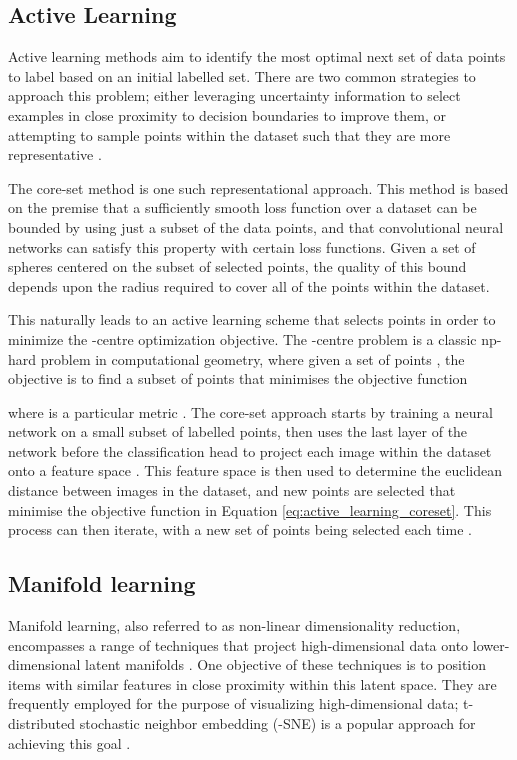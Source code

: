 \documentclass{article}
\begin{document}
\subsection{Active Learning}

Active learning methods aim to identify the most optimal next set of data points to label based on an initial labelled set. There are two common strategies to approach this problem; either leveraging uncertainty information to select examples in close proximity to decision boundaries to improve them, or attempting to sample points within the dataset such that they are more representative \citep{budd2021survey}.

The core-set method \citep{sener2017active} is one such representational approach. This method is based on the premise that a sufficiently smooth loss function over a dataset can be bounded by using just a subset of the data points, and that convolutional neural networks can satisfy this property with certain loss functions. Given a set of spheres centered on the subset of selected points, the quality of this bound depends upon the radius required to cover all of the points within the dataset.

This naturally leads to an active learning scheme that selects points in order to minimize the -centre optimization objective. The -centre problem \citep{dyer1985simple} is a classic np-hard problem in computational geometry, where given a set of points , the objective is to find a subset  of  points that minimises the objective function 



where  is a particular metric \citep{dyer1985simple}. The core-set approach starts by training a neural network on a small subset of labelled points, then uses the last layer of the network before the classification head to project each image within the dataset onto a feature space . This feature space is then used to determine the euclidean distance between images in the dataset, and new points are selected that minimise the objective function in Equation \ref{eq:active_learning_coreset}. This process can then iterate, with a new set of points being selected each time \citep{sener2017active}.

\subsection{Manifold learning}

Manifold learning, also referred to as non-linear dimensionality reduction, encompasses a range of techniques that project high-dimensional data onto lower-dimensional latent manifolds \citep{turaga2020manifold}. One objective of these techniques is to position items with similar features in close proximity within this latent space. They are frequently employed for the purpose of visualizing high-dimensional data; t-distributed stochastic neighbor embedding (-SNE) is a popular approach for achieving this goal \citep{van2008visualizing}.
\end{document}
